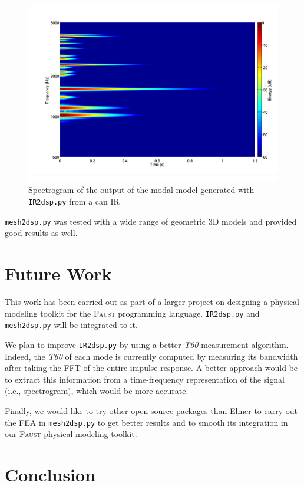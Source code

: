 \documentclass[11pt,a4paper]{article}
\newcommand{\f}{\textsc{Faust}}
\begin{document}
\begin{figure}[htbp]
  \centering
  \includegraphics[width=\columnwidth]{pictures/canModalModel}
  \caption{Spectrogram of the output of the modal model generated with \texttt{IR2dsp.py} from a can IR}
  \label{fig:spectro2}
\end{figure}

\texttt{mesh2dsp.py} was tested with a wide range of geometric 3D models and provided good results as well. 

\section{Future Work}
\label{sec:future}

This work has been carried out as part of a larger project on designing a physical modeling toolkit for the \f{} programming language. \texttt{IR2dsp.py} and \texttt{mesh2dsp.py} will be integrated to it.

We plan to improve \texttt{IR2dsp.py} by using a better \textit{T60} measurement algorithm. Indeed, the \textit{T60} of each mode is currently computed by measuring its bandwidth after taking the FFT of the entire impulse response. A better approach would be to extract this information from a time-frequency representation of the signal (i.e., spectrogram), which would be more accurate.

Finally, we would like to try other open-source packages than Elmer to carry out the FEA in \texttt{mesh2dsp.py} to get better results and to smooth its integration in our \f{} physical modeling toolkit.  

\section{Conclusion}
\end{document}
